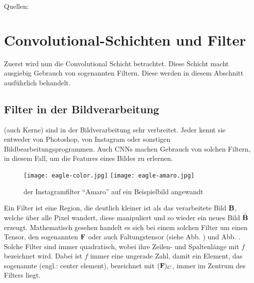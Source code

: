 \para{}
Quellen: \cite{Goodfellow-et-al-2016} \cite{deeplearning.ai:cnn} \cite{wiki:cnn}


\section{Convolutional-Schichten und Filter}
Zuerst wird nun die Convolutional Schicht betrachtet. Diese Schicht macht ausgiebig
Gebrauch von sogenannten Filtern. Diese werden in diesem Abschnitt ausführlich behandelt.

\subsection{Filter in der Bildverarbeitung}
 (auch Kerne) sind in der Bildverarbeitung sehr verbreitet. Jeder kennt sie entweder
von Photoshop, von Instagram oder sonstigen Bildbearbeitungsprogrammen.
Auch CNNs machen Gebrauch von solchen Filtern, in diesem Fall, um die Features eines Bildes zu
erlernen.

\begin{figure}[h!]
  \centering
  \texttt{[image: eagle-color.jpg]}
  \texttt{[image: eagle-amaro.jpg]}
  \caption{der Instagramfilter ``Amaro'' auf ein Beispielbild angewandt \cite{res:eagle_image}}
\end{figure}

\para{}
Ein Filter ist eine Region, die deutlich kleiner ist als das verarbeitete Bild
$\mathbf{B}$, welche über alle Pixel wandert, diese manipuliert und so wieder ein neues Bild
$\tilde{\mathbf{B}}$ erzeugt.
Mathematisch gesehen handelt es sich bei einem solchen Filter um einen Tensor,
den sogenannten  $\mathbf{F}$ oder auch Faltungstensor (siehe Abb.
) und Abb. . Solche Filter sind immer quadratisch, wobei ihre
Zeilen- und Spaltenlänge mit $f$ bezeichnet wird. Dabei ist $f$ immer eine ungerade Zahl, damit ein
Element, das sogenannte  (engl.: center element), bezeichnet mit $(\mathbf{F})_C$,
immer im Zentrum des Filters liegt. \\

